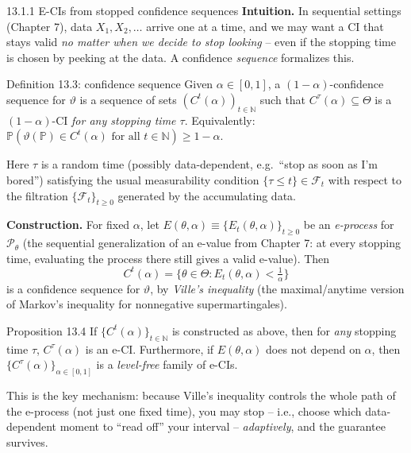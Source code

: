 \documentclass[aspectratio=169,10pt]{beamer}
\newcommand{\Pb}{\mathbb{P}}
\newcommand{\calF}{\mathcal{F}}
\newcommand{\calP}{\mathcal{P}}
\newcommand{\Theset}{\Theta}
\begin{document}
\begin{frame}[allowframebreaks]{13.1.1 E-CIs from stopped confidence sequences}
  \textbf{Intuition.} In sequential settings (Chapter 7), data $X_1,X_2,\dots$ arrive one at a time, and we may want a CI that stays valid \emph{no matter when we decide to stop looking} -- even if the stopping time is chosen by peeking at the data. A confidence \emph{sequence} formalizes this.

  \begin{block}{Definition 13.3: confidence sequence}
    Given $\alpha\in[0,1]$, a $(1-\alpha)$-confidence sequence for $\vartheta$ is a sequence of sets $(C^t(\alpha))_{t\in\mathbb{N}}$ such that $C^\tau(\alpha)\subseteq\Theset$ is a $(1-\alpha)$-CI \emph{for any stopping time $\tau$}. Equivalently: $\Pb(\vartheta(\Pb)\in C^t(\alpha) \text{ for all } t\in\mathbb{N}) \geq 1-\alpha$.
  \end{block}
  Here $\tau$ is a random time (possibly data-dependent, e.g.\ ``stop as soon as I'm bored'') satisfying the usual measurability condition $\{\tau\le t\}\in\calF_t$ with respect to the filtration $\{\calF_t\}_{t\geq0}$ generated by the accumulating data.

  \framebreak

  \textbf{Construction.} For fixed $\alpha$, let $E(\theta,\alpha)\equiv\{E_t(\theta,\alpha)\}_{t\geq0}$ be an \emph{e-process} for $\calP_\theta$ (the sequential generalization of an e-value from Chapter 7: at every stopping time, evaluating the process there still gives a valid e-value). Then
  \[
    C^t(\alpha) = \Big\{\theta\in\Theset : E_t(\theta,\alpha) < \tfrac1\alpha\Big\}
  \]
  is a confidence sequence for $\vartheta$, by \emph{Ville's inequality} (the maximal/anytime version of Markov's inequality for nonnegative supermartingales).

  \begin{block}{Proposition 13.4}
    If $\{C^t(\alpha)\}_{t\in\mathbb{N}}$ is constructed as above, then for \emph{any} stopping time $\tau$, $C^\tau(\alpha)$ is an e-CI. Furthermore, if $E(\theta,\alpha)$ does not depend on $\alpha$, then $\{C^\tau(\alpha)\}_{\alpha\in[0,1]}$ is a \emph{level-free} family of e-CIs.
  \end{block}
  This is the key mechanism: because Ville's inequality controls the whole path of the e-process (not just one fixed time), you may stop -- i.e., choose which data-dependent moment to ``read off'' your interval -- \emph{adaptively}, and the guarantee survives.
\end{frame}
\end{document}
